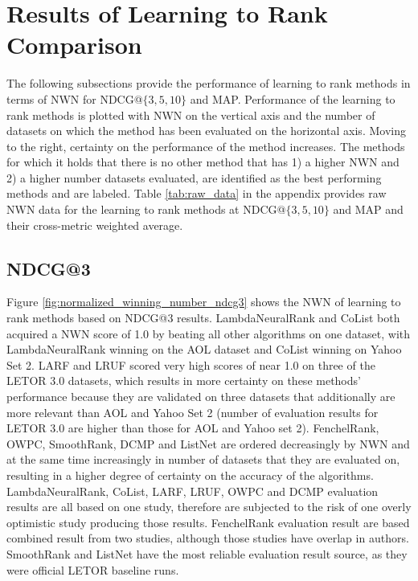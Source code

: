 \documentclass{sig-alternate}
\begin{document}
\section{Results of Learning to Rank Comparison}
The following subsections provide the performance of learning to rank methods in terms of NWN for NDCG@$\{3,5,10\}$ and MAP. Performance of the learning to rank methods is plotted with NWN on the vertical axis and the number of datasets on which the method has been evaluated on the horizontal axis. Moving to the right, certainty on the performance of the method increases. The methods for which it holds that there is no other method that has 1) a higher NWN and 2) a higher number datasets evaluated, are identified as the best performing methods and are labeled. Table \ref{tab:raw_data} in the appendix provides raw NWN data for the learning to rank methods at NDCG@$\{3,5,10\}$ and MAP and their cross-metric weighted average.

\subsection{NDCG@3}
Figure \ref{fig:normalized_winning_number_ndcg3} shows the NWN of learning to rank methods based on NDCG@3 results. LambdaNeuralRank and CoList both acquired a NWN score of 1.0 by beating all other algorithms on one dataset, with LambdaNeuralRank winning on the AOL dataset and CoList winning on Yahoo Set 2. LARF and LRUF scored very high scores of near 1.0 on three of the LETOR 3.0 datasets, which results in more certainty on these methods' performance because they are validated on three datasets that additionally are more relevant than AOL and Yahoo Set 2 (number of evaluation results for LETOR 3.0 are higher than those for AOL and Yahoo set 2). FenchelRank, OWPC, SmoothRank, DCMP and ListNet are ordered decreasingly by NWN and at the same time increasingly in number of datasets that they are evaluated on, resulting in a higher degree of certainty on the accuracy of the algorithms.\\

LambdaNeuralRank, CoList, LARF, LRUF, OWPC and DCMP evaluation results are all based on one study, therefore are subjected to the risk of one overly optimistic study producing those results. FenchelRank evaluation result are based combined result from two studies, although those studies have overlap in authors. SmoothRank and ListNet have the most reliable evaluation result source, as they were official LETOR baseline runs.  
\end{document}
